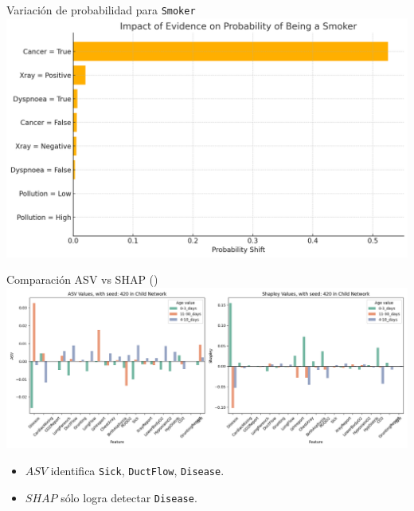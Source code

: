 \begin{frame}{Variaci\'on de probabilidad para \texttt{Smoker}}
	\centering
	\includegraphics[width=0.95\linewidth]{pic/img/asvResults/probabilityShift.png}
\end{frame}

\begin{frame}{Comparaci\'on ASV vs SHAP (\childNetwork)}
	\centering 
	\includegraphics[width=0.95\linewidth]{pic/img/asvResults/childASVAndShapleyExactASVAndShapley.png}
	\vspace{0.5em}
	\begin{itemize}[<+->]
		\item $ASV$ identifica \texttt{Sick}, \texttt{DuctFlow}, \texttt{Disease}.
		\item $SHAP$ sólo logra detectar \texttt{Disease}.
	\end{itemize}
\end{frame}


